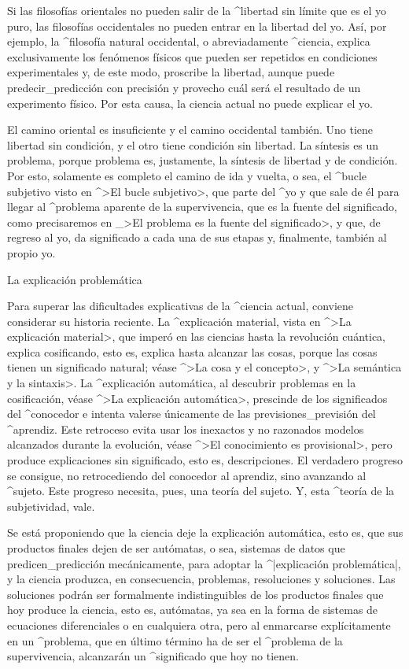 Si las filosofías orientales no pueden salir de la ^{libertad} sin
límite que es el yo puro, las filosofías occidentales no pueden entrar
en la libertad del yo. Así, por ejemplo, la ^{filosofía} natural
occidental, o abreviadamente ^{ciencia}, explica exclusivamente los
fenómenos físicos que pueden ser repetidos en condiciones experimentales
y, de este modo, proscribe la libertad, aunque puede
predecir_{predicción} con precisión y provecho cuál será el resultado de
un experimento físico. Por esta causa, la ciencia actual no puede
explicar el yo.

El camino oriental es insuficiente y el camino occidental también. Uno
tiene libertad sin condición, y el otro tiene condición sin libertad. La
síntesis es un problema, porque problema es, justamente, la síntesis de
libertad y de condición. Por esto, solamente es completo el camino de
ida y vuelta, o sea, el ^{bucle subjetivo} visto en ^>El bucle
subjetivo>, que parte del ^{yo} y que sale de él para llegar al
^{problema aparente} de la supervivencia, que es la fuente del
significado, como precisaremos en _>El problema es la fuente del
significado>, y que, de regreso al yo, da significado a cada una de sus
etapas y, finalmente, también al propio yo.


\Section La explicación problemática

Para superar las dificultades explicativas de la ^{ciencia} actual,
conviene considerar su historia reciente. La ^{explicación material},
vista en ^>La explicación material>, que imperó en las ciencias hasta la
revolución cuántica, explica cosificando, esto es, explica hasta
alcanzar las cosas, porque las cosas tienen un significado natural;
véase ^>La cosa y el concepto>, y ^>La semántica y la sintaxis>. La
^{explicación automática}, al descubrir problemas en la cosificación,
véase ^>La explicación automática>, prescinde de los significados del
^{conocedor} e intenta valerse únicamente de las previsiones_{previsión}
del ^{aprendiz}. Este retroceso evita usar los inexactos y no razonados
modelos alcanzados durante la evolución, véase ^>El conocimiento es
provisional>, pero produce explicaciones sin significado, esto es,
descripciones. El verdadero progreso se consigue, no retrocediendo del
conocedor al aprendiz, sino avanzando al ^{sujeto}. Este progreso
necesita, pues, una teoría del sujeto. Y, esta ^{teoría de la
subjetividad}, vale.

Se está proponiendo que la ciencia deje la explicación automática, esto
es, que sus productos finales dejen de ser autómatas, o sea, sistemas de
datos que predicen_{predicción} mecánicamente, para adoptar la
^|explicación problemática|, y la ciencia produzca, en consecuencia,
problemas, resoluciones y soluciones. Las soluciones podrán ser
formalmente indistinguibles de los productos finales que hoy produce la
ciencia, esto es, autómatas, ya sea en la forma de sistemas de
ecuaciones diferenciales o en cualquiera otra, pero al enmarcarse
explícitamente en un ^{problema}, que en último término ha de ser el
^{problema de la supervivencia}, alcanzarán un ^{significado} que hoy no
tienen.


